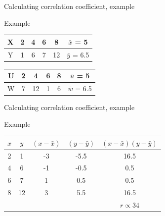 \documentclass[xcolor=table, handout]{beamer}
\begin{document}
\begin{frame}{Calculating correlation coefficient, example}
\begin{exampleblock}{Example}
{\centering
\begin{tabular}{c | c c c c | c}
X & 2 & 4 & 6 & 8 & $\bar x$ = 5\\
\hline
Y & 1 & 6 & 7 & 12 & $\bar y$ = 6.5
\end{tabular}\qquad
\begin{tabular}{c | c c c c | c}
U & 2 & 4 & 6 & 8 & $\bar u$ = 5\\
\hline
W & 7 & 12 & 1 & 6 & $\bar w$ = 6.5
\end{tabular}
\par}
\end{exampleblock}
\end{frame}


\begin{frame}{Calculating correlation coefficient, example}
\begin{exampleblock}{Example}
{\centering
\begin{tabular}{c | c | c | c | c }
$x$ & $y$ & $(x - \bar x)$ & $(y-\bar y)$ & $(x - \bar x)(y-\bar y)$\\
\hline
2 & 1 & -3 & -5.5 & 16.5\\
4 & 6 & -1 & -0.5 & 0.5\\
6 & 7 & 1 & 0.5 & 0.5\\
8 & 12 & 3 & 5.5 & 16.5\\
\hline
 \multicolumn{4}{r}{} & $r \propto 34$
\end{tabular}\\
\par}
\end{exampleblock}
\end{frame}
\end{document}
